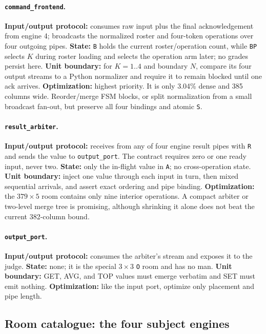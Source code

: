 \documentclass[11pt,a4paper]{article}
\newcommand{\op}[1]{\texttt{#1}}
\begin{document}
\paragraph{\texttt{command\_frontend}.}
\textbf{Input/output protocol:} consumes raw input plus the final
acknowledgement from engine 4; broadcasts the normalized roster and
four-token operations over four outgoing pipes. \textbf{State:} \op{B}
holds the current roster/operation count, while \op{BP} selects $K$ during
roster loading and selects the operation arm later; no grades persist here.
\textbf{Unit boundary:} for $K=1..4$ and boundary $N$, compare its four output
streams to a Python normalizer and require it to remain blocked until one ack
arrives. \textbf{Optimization:} highest priority. It is only 3.04\% dense and
385 columns wide. Reorder/merge FSM blocks, or split normalization from a
small broadcast fan-out, but preserve all four bindings and atomic \op{S}.

\paragraph{\texttt{result\_arbiter}.}
\textbf{Input/output protocol:} receives from any of four engine result pipes
with \op{R} and sends the value to \texttt{output\_port}. The contract
requires zero or one ready input, never two. \textbf{State:} only the
in-flight value in \op{A}; no cross-operation state. \textbf{Unit boundary:}
inject one value through each input in turn, then mixed sequential arrivals,
and assert exact ordering and pipe binding. \textbf{Optimization:} the
$379\times5$ room contains only nine interior operations. A compact arbiter
or two-level merge tree is promising, although shrinking it alone does not
beat the current 382-column bound.

\paragraph{\texttt{output\_port}.}
\textbf{Input/output protocol:} consumes the arbiter's stream and exposes it
to the judge. \textbf{State:} none; it is the special $3\times3$
\texttt{O} room and has no man. \textbf{Unit boundary:} GET, AVG, and TOP values
must emerge verbatim and SET must emit nothing. \textbf{Optimization:} like
the input port, optimize only placement and pipe length.

\subsection{Room catalogue: the four subject engines}
\end{document}
